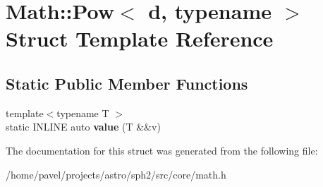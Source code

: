 \hypertarget{structMath_1_1Pow}{}\section{Math\+:\+:Pow$<$ d, typename $>$ Struct Template Reference}
\label{structMath_1_1Pow}
\subsection*{Static Public Member Functions}
\begin{DoxyCompactItemize}
\item 
\hypertarget{structMath_1_1Pow_ac06aece9a0c5dde764987d3e048a9ab3}{}\label{structMath_1_1Pow_ac06aece9a0c5dde764987d3e048a9ab3} 
{\footnotesize template$<$typename T $>$ }\\static I\+N\+L\+I\+NE auto {\bfseries value} (T \&\&v)
\end{DoxyCompactItemize}


The documentation for this struct was generated from the following file\+:\begin{DoxyCompactItemize}
\item 
/home/pavel/projects/astro/sph2/src/core/math.\+h\end{DoxyCompactItemize}
